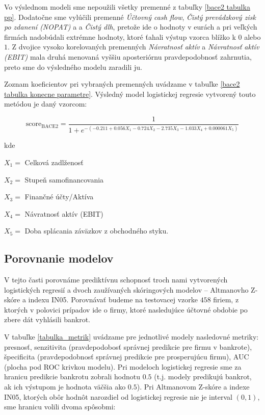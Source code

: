 Vo výslednom modeli sme nepoužili všetky premenné z tabuľky \ref{bace2 tabulka pp}.
Dodatočne sme vylúčili premenné \emph{Účtovný cash flow}, \emph{Čistý prevádzkový zisk po zdanení (NOPAT)} a a \emph{Čistý dlh},
pretože ide o hodnoty v eurách a pri veľkých firmách nadobúdali extrémne hodnoty, ktoré ťahali výstup vzorca blížko k \(0\) alebo \(1\).
Z dvojice vysoko korelovaných premenných \emph{Návratnosť aktív} a \emph{Návratnosť aktív (EBIT)} mala druhá menovaná vyššiu aposteriórnu pravdepodobnosť zahrnutia,
preto sme do výsledného modelu zaradili ju.

Zoznam koeficientov pri vybraných premenných uvádzame v tabuľke \ref{bace2 tabulka konecne parametre}.
Výsledný model logistickej regresie vytvorený touto metódou je daný vzorcom:

\[
    \text{score}_\text{BACE2} = \frac{1}{1 + e^{-(-0.211 + 0.056X_1 - 0.724X_2 - 2.735X_3 - 1.033X_4 + 0.000061X_5)}}
\]

kde

\(X_1 = \) Celková zadlženosť

\(X_2 = \) Stupeň samofinancovania

\(X_3 = \) Finančné účty/Aktíva

\(X_4 = \) Návratnosť aktív (EBIT)

\(X_5 = \) Doba splácania záväzkov z obchodného styku.


\subsection{Porovnanie modelov}

V tejto časti porovnáme prediktívnu schopnosť troch nami vytvorených logistických regresií a dvoch zaužívaných skóringových modelov – Altmanovho Z-skóre a indexu IN05.
Porovnávať budeme na testovacej vzorke \(458\) firiem, z ktorých v polovici prípadov ide o firmy, ktoré nasledujúce účtovné obdobie po zbere dát vyhlásili bankrot.

V tabuľke \ref{tabulka_metrik} uvádzame pre jednotlivé modely nasledovné metriky:
presnosť, senzitivita (pravdepodobosť správnej predikcie pre firmu v bankrote), špecificita (pravdepodobnosť správnej predikcie pre prosperujúcu firmu), AUC (plocha pod ROC krivkou modelu).
Pri modeloch logistickej regresie sme za hranicu predikcie bankrotu zobrali hodnotu \(0.5\) (t.j. modely predikujú bankrot, ak ich výstupom je hodnota väčšia ako \(0.5\)).
Pri Altmanovom Z-skóre a indexe IN05, ktorých obôr hodnôt narozdiel od logistickej regresie nie je interval \((0, 1)\), sme hranicu volili dvoma spôsobmi:

